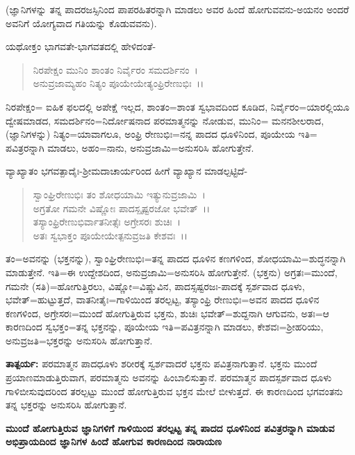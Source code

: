(ಜ್ಞಾನಿಗಳನ್ನು ತನ್ನ ಪಾದರಜಸ್ಸಿನಿಂದ ಪಾಪರಹಿತರನ್ನಾಗಿ ಮಾಡಲು ಅವರ ಹಿಂದೆ ಹೋಗುವವನು-ಅಯನಂ ಅಂದರೆ ಅವನಿಗೆ ಯೋಗ್ಯವಾದ ಗತಿಯನ್ನು ಕೊಡುವವನು).

ಯಥೋಕ್ತಂ ಭಾಗವತೇ-ಭಾಗವತದಲ್ಲಿ ಹೇಳಿದಂತೆ-

\begin{verse}
ನಿರಪೇಕ್ಷಂ ಮುನಿಂ ಶಾಂತಂ ನಿರ್ವೈರಂ ಸಮದರ್ಶಿನಂ~।\\ ಅನುವ್ರಜಾಮ್ಯಹಂ ನಿತ್ಯಂ ಪೂಯೇಯೇತ್ಯಂಫ್ರಿರೇಣುಭಿಃ~।।
\end{verse}

ನಿರಪೇಕ್ಷಂ= ಐಹಿಕ ಫಲದಲ್ಲಿ ಅಪೇಕ್ಷೆ ಇಲ್ಲದ, ಶಾಂತಂ=ಶಾಂತ ಸ್ವಭಾವದಿಂದ ಕೂಡಿದ, ನಿರ್ವೈರಂ=ಯಾರಲ್ಲಿಯೂ ದ್ವೇಷಮಾಡದ, ಸಮದರ್ಶಿನಂ=ನಿರ್ದೋಷನಾದ ಪರಮಾತ್ಮನನ್ನು ನೋಡುವ, ಮುನಿಂ= ಮನನಶೀಲರಾದ, (ಜ್ಞಾನಿಗಳನ್ನು) ನಿತ್ಯಂ=ಯಾವಾಗಲೂ, ಅಂಫ್ರಿ ರೇಣುಭಿಃ=ನನ್ನ ಪಾದದ ಧೂಳಿನಿಂದ, ಪೂಯೇಯ ಇತಿ= ಪವಿತ್ರರನ್ನಾಗಿ ಮಾಡಲು, ಅಹಂ=ನಾನು, ಅನುವ್ರಜಾಮಿ=ಅನುಸರಿಸಿ ಹೋಗುತ್ತೇನೆ.

ವ್ಯಾಖ್ಯಾತಂ ಭಗವತ್ಪಾದೈಃ-ಶ‍್ರೀಮದಾಚಾರ್ಯರಿಂದ ಹೀಗೆ ವ್ಯಾಖ್ಯಾನ ಮಾಡಲ್ಪಟ್ಟಿದೆ-

\begin{verse}
ಸ್ವಾಂಘ್ರಿರೇಣುಭಿಃ ತಂ ಶೋಧಯಾಮಿ ಇತ್ಯುನುವ್ರಜಾಮಿ~।\\ ಅಗ್ರತೋ ಗಮನೇ ವಿಷ್ಣೋಃ ಪಾದಸ್ಪೃಷ್ಟರಜೋ ಭವೇತ್~।।\\ ತಸ್ಯಾಂಫ್ರಿರೇಣುಭಿರ್ವಾತನೀತ್ಸೆಃ ಅಗ್ರೇಸರಃ ಶುಚಿಃ~।\\ ಅತಃ ಸ್ವಭಾಕ್ತಂ ಪೂಯೇಯೇತ್ಪನುವ್ರಜತಿ ಕೇಶವಃ~।।
\end{verse}

ತಂ=ಅವನನ್ನು (ಭಕ್ತನನ್ನು), ಸ್ವಾಂಘ್ರಿರೇಣುಭಿಃ=ತನ್ನ ಪಾದದ ಧೂಳಿನ ಕಣಗಳಿಂದ, ಶೋಧಯಾಮಿ=ಶುದ್ಧನನ್ನಾಗಿ ಮಾಡುತ್ತೇನೆ. ಇತಿ=ಈ ಉದ್ದೇಶದಿಂದ, ಅನುವ್ರಜಾಮಿ=ಅನುಸರಿಸಿ ಹೋಗುತ್ತೇನೆ. (ಭಕ್ತನು) ಅಗ್ರತಃ=ಮುಂದೆ, ಗಮನೇ (ಸತಿ)=ಹೋಗುತ್ತಿರಲು, ವಿಷ್ಣೋ=ವಿಷ್ಣುವಿನ, ಪಾದಸ್ಸಷ್ಟರಜಃ-ಪಾದಕ್ಕೆ ಸ್ಪರ್ಶವಾದ ಧೂಳು, ಭವೇತ್=ಹುಟ್ಟುತ್ತದೆ, ವಾತನೀತೈಃ=ಗಾಳಿಯಿಂದ ತರಲ್ಪಟ್ಟ, ತಸ್ಯಾಂಫ್ರಿ ರೇಣುಭಿಃ=ಅವನ ಪಾದದ ಧೂಳಿನ ಕಣಗಳಿಂದ, ಅಗ್ರೇಸರಃ=ಮುಂದೆ ಹೋಗುತ್ತಿರುವ ಭಕ್ತನು, ಶುಚಿಃ ಭವೇತ್=ಶುದ್ದನಾಗಿ ಆಗುವನು, ಅತಃ=ಆ ಕಾರಣದಿಂದ ಸ್ವಭಕ್ತಂ=ತನ್ನ ಭಕ್ತನನ್ನು, ಪೂಯೇಯ ಇತಿ=ಪವಿತ್ರನನ್ನಾಗಿ ಮಾಡಲು, ಕೇಶವಃ=ಶ‍್ರೀಹರಿಯು, ಅನುವ್ರಜತಿ=ಭಕ್ತರನ್ನು ಅನುಸರಿಸಿ ಹೋಗುತ್ತಾನೆ.

\textbf{ತಾತ್ಪರ್ಯ:} ಪರಮಾತ್ಮನ ಪಾದಧೂಳು ಶರೀರಕ್ಕೆ ಸ್ವರ್ಶವಾದರೆ ಭಕ್ತನು ಪವಿತ್ರನಾಗುತ್ತಾನೆ. ಭಕ್ತನು ಮುಂದೆ ಪ್ರಯಾಣಮಾಡುತ್ತಿರುವಾಗ, ಪರಮಾತ್ಮನು ಅವನನ್ನು ಹಿಂಬಾಲಿಸುತ್ತಾನೆ. ಪರಮಾತ್ಮನ ಪಾದಸ್ಪರ್ಶವಾದ ಧೂಳು ಗಾಳಿಬೀಸುವುದರಿಂದ ತರಲ್ಪಟ್ಟು ಮುಂದೆ ಹೋಗುತ್ತಿರುವ ಭಕ್ತನ ಮೇಲೆ ಬೀಳುತ್ತದೆ. ಈ ಕಾರಣದಿಂದ ಭಗವಂತನು ತನ್ನ ಭಕ್ತರನ್ನು ಅನುಸರಿಸಿ ಹೋಗುತ್ತಾನೆ.

\begin{center}
\textbf{ಮುಂದೆ ಹೋಗುತ್ತಿರುವ ಜ್ಞಾನಿಗಳಿಗೆ ಗಾಳಿಯಿಂದ ತರಲ್ಪಟ್ಟ ತನ್ನ ಪಾದದ ಧೂಳಿನಿಂದ ಪವಿತ್ರರನ್ನಾಗಿ ಮಾಡುವ ಅಭಿಪ್ರಾಯದಿಂದ ಜ್ಞಾನಿಗಳ ಹಿಂದೆ ಹೋಗುವ ಕಾರಣದಿಂದ ನಾರಾಯಣ}
\end{center}

